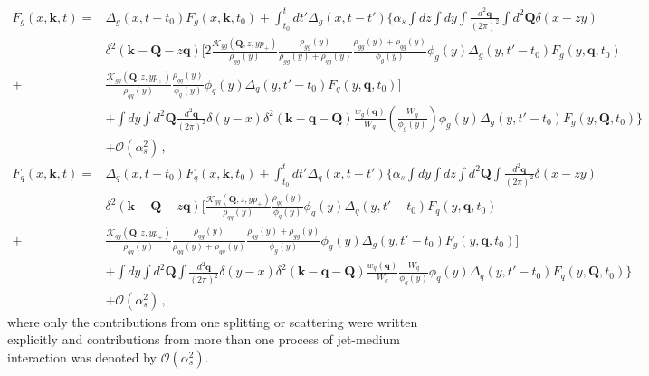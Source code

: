 \documentclass[preprint,12pt]{elsarticle}
\begin{document}
\begin{align}
    F_g(x,\mathbf{k},t)=&\Delta_g(x,t-t_0)F_g(x,\mathbf{k},t_0)+\int_{t_0}^t dt' \Delta_g(x,t-t')\bigg\{ \alpha_s\int dz \int dy \int \frac{d^2 \mathbf{q}}{(2\pi)^2}\int d^2\mathbf{Q} \delta(x-zy)        \nonumber\\
    &\delta^2(\mathbf{k}-\mathbf{Q}-z\mathbf{q})
\bigg[2\frac{\mathcal{K}_{gg}(\mathbf{Q},z,yp_+)}{\rho_{gg}(y)}\frac{\rho_{gg}(y)}{\rho_{gg}(y)+\rho_{qg}(y)}\frac{\rho_{gg}(y)+\rho_{qg}(y)}{\phi_g(y)}\phi_g(y)\Delta_g(y,t'-t_0)F_g(y,\mathbf{q},t_0)
    \nonumber\\
+&\frac{\mathcal{K}_{gq}(\mathbf{Q},z,yp_+)}{\rho_{qq}(y)}\frac{\rho_{qq}(y)}{\phi_q(y)}\phi_q(y)\Delta_q(y,t'-t_0)F_q(y,\mathbf{q},t_0)\bigg]
    \nonumber\\
    &+\int dy \int d^2\mathbf{Q}  \frac{d^2\mathbf{q}}{(2\pi)^2} \delta(y-x) \delta^2(\mathbf{k}-\mathbf{q}-\mathbf{Q})\frac{w_g(\mathbf{q})}{W_g}  
    \left( \frac{W_g}{\phi_g(y)}\right)\phi_g(y)
    \Delta_g(y,t'-t_0)F_g(y,\mathbf{Q},t_0)\bigg\}
    \nonumber\\&+\mathcal{O}(\alpha_s^2)\,,
    \label{eq:bdim_int_g4}
    \\
    F_q(x,\mathbf{k},t)=&\Delta_q(x,t-t_0)F_q(x,\mathbf{k},t_0)+\int_{t_0}^t dt' \Delta_q(x,t-t')\bigg\{ \alpha_s\int dy \int dz\int d^2\mathbf{Q}\int \frac{d^2 \mathbf{q}}{(2\pi)^2} \delta(x-zy)
        \nonumber\\
        &\delta^2(\mathbf{k}-\mathbf{Q}-z\mathbf{q})
    \bigg[\frac{\mathcal{K}_{qq}(\mathbf{Q},z,yp_+)}{\rho_{qq}(y)}\frac{\rho_{qq}(y)}{\phi_q(y)}\phi_q(y)\Delta_q(y,t'-t_0)F_q(y,\mathbf{q},t_0)
    \nonumber\\
+&\frac{\mathcal{K}_{qg}(\mathbf{Q},z,yp_+)}{\rho_{qg}(y)}\frac{\rho_{qg}(y)}{\rho_{qg}(y)+\rho_{gg}(y)}\frac{\rho_{qg}(y)+\rho_{gg}(y)}{\phi_g(y)}\phi_g(y)\Delta_g(y,t'-t_0)F_g(y,\mathbf{q},t_0)\bigg]
    \nonumber\\
    &+\int dy \int d^2\mathbf{Q} \int  \frac{d^2\mathbf{q}}{(2\pi)^2} \delta(y-x) \delta^2(\mathbf{k}-\mathbf{q}-\mathbf{Q}) \frac{w_q(\mathbf{q})}{W_q}  
    \frac{W_q}{\phi_q(y)}\phi_q(y)\Delta_q(y,t'-t_0)F_q(y,\mathbf{Q},t_0)\bigg\}
    \nonumber\\&
    +\mathcal{O}(\alpha_s^2)\,,
    \label{eq:bdim_int_q4}
\end{align}
%
where only the contributions from one splitting or scattering were written explicitly and contributions from more than one process of jet-medium interaction was denoted by $\mathcal{O}(\alpha_s^2)$.
\end{document}
